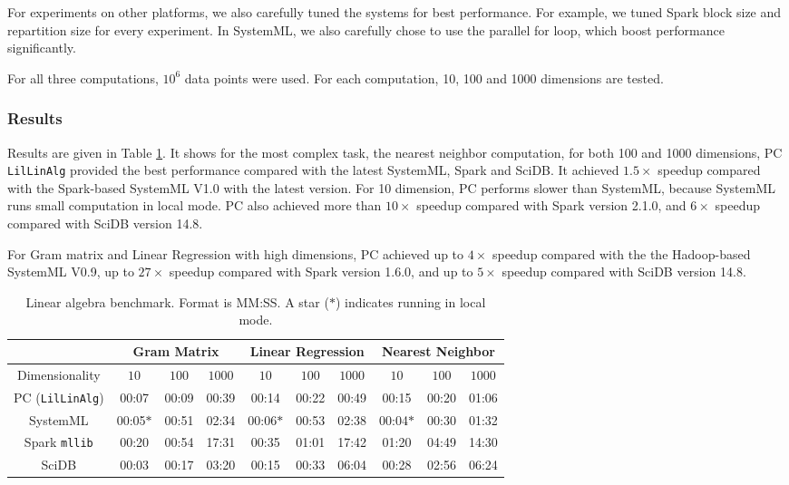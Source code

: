 For experiments on other platforms, we also carefully tuned the
systems for best performance. For example, we tuned Spark block size and repartition
size for every experiment. In SystemML, we also carefully chose to
use the parallel for loop, which boost performance significantly.

For
all three computations, 
$10^6$ data points were used. For each computation, 10, 100 and 1000
dimensions are tested.


\subsubsection {Results}

Results are given in 
Table \ref{fig:LR}. It shows for the most complex task, the nearest
neighbor computation, for both 100 and 1000 dimensions, PC
\texttt{LilLinAlg} provided the best performance compared with the latest
SystemML, Spark and SciDB. It achieved $1.5\times$ speedup compared with
the Spark-based
SystemML V1.0 with the latest version. For 10 dimension, PC performs slower
than SystemML, because SystemML runs small computation in local
mode. PC also achieved more than $10\times$ speedup compared with
Spark version 2.1.0, and $6\times$ speedup compared with SciDB version
14.8. 

For Gram matrix and Linear Regression with high dimensions, PC achieved up to
$4\times$ speedup compared with the the Hadoop-based SystemML V0.9, up to $27\times$
speedup compared with Spark version 1.6.0, and up to $5\times$ speedup compared
with SciDB version 14.8.



\begin{table}[h!]
\begin{center}
\begin{tabular}{|c||c|c|c||c|c|c||c|c|c||}
\hline
& \multicolumn{3}{c||}{Gram Matrix} & \multicolumn{3}{c||}{Linear Regression} & \multicolumn{3}{c||}{Nearest Neighbor} \\
\hline
Dimensionality & $10$ & $100$ & $1000$& $10$ & $100$ & $1000$& $10$ & $100$ & $1000$ \\
\hline
\hline
PC (\texttt{LilLinAlg}) &00:07 & 00:09 &00:39 &00:14 &00:22 &00:49& 00:15 & 00:20 & 01:06 \\
SystemML &00:05$*$ &00:51 &02:34 &00:06$*$ &00:53 &02:38 &00:04$*$ &00:30 &01:32 \\
Spark \texttt{mllib} &00:20  &00:54 &17:31 &00:35 &01:01 &17:42 &01:20 & 04:49 &14:30 \\
SciDB   &00:03 &00:17 &03:20 &00:15 &00:33 &06:04 &00:28 &02:56 & 06:24 \\
\hline
\end{tabular}
\caption{Linear algebra benchmark. Format is MM:SS.
A star ($*$) indicates running in local mode.}
\label{fig:LR}
\end{center}
\end{table}


